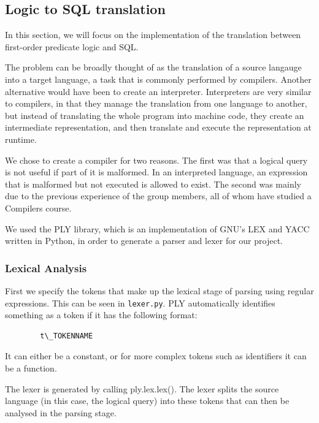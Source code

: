 \documentclass[a4paper, 11pt]{article}
\begin{document}
    \subsection{Logic to SQL translation}

      In this section, we will focus on the implementation of the translation
      between first-order predicate logic and SQL.

      The problem can be broadly thought of as the translation of a source
      langauge into a target language, a task that is commonly performed by
      compilers. Another alternative would have been to create an interpreter.
      Interpreters are very similar to compilers, in that they manage the
      translation from one language to another, but instead of translating the
      whole program into machine code, they create an intermediate
      representation, and then translate and execute the representation at
      runtime.

      We chose to create a compiler for two reasons. The first was that a
      logical query is not useful if part of it is malformed. In an interpreted
      language, an expression that is malformed but not executed is allowed to
      exist. The second was mainly due to the previous experience of the group
      members, all of whom have studied a Compilers course.

      We used the PLY library, which is an implementation of GNU's LEX and YACC
      written in Python, in order to generate a parser and lexer for our
      project.
    \subsubsection{Lexical Analysis}

      First we specify the tokens that make up the lexical stage of parsing
      using regular expressions. This can be seen in
      \texttt{lexer.py}. PLY automatically identifies something as a token if it
      has the following format:
      \begin{verbatim}
        t\_TOKENNAME
      \end{verbatim}
      It can either be a constant, or for more complex tokens such as
      identifiers it can be a function.

      The lexer is generated by calling ply.lex.lex(). The lexer splits the
      source language (in this case, the logical query) into these tokens that
      can then be analysed in the parsing stage.
\end{document}
